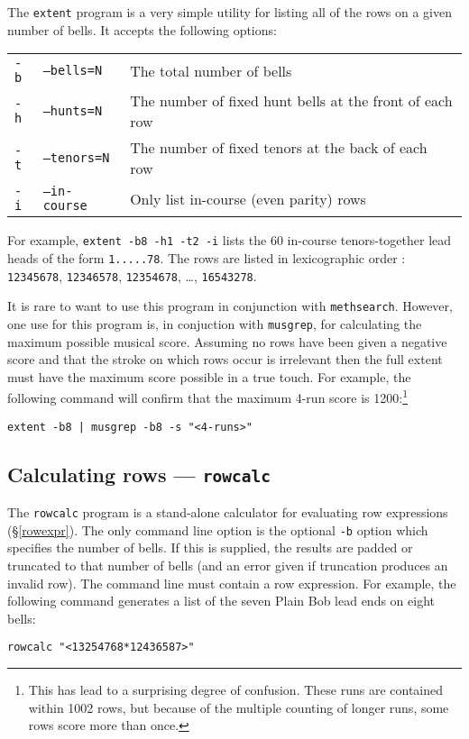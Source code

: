 \documentclass[a4paper,11pt,oneside]{book}
\makeatletter
\newcommand{\ttcmdidx}[1]{\texttt{#1}\index{#1@{\texttt{#1}}}}
\def\methsearch{\texttt{meth\-search}}
\newcommand{\sref}[1]{\hyperref[#1]{\S\ref{#1}}}
\makeatother
\begin{document}
The \ttcmdidx{extent} program is a very simple utility for listing all
of the rows on a given number of bells.  It accepts the following options:

\begin{tabularx}{\textwidth}{llX}
\texttt{-b}&\texttt{--bells=N}&The total number of bells\\
\texttt{-h}&\texttt{--hunts=N}&The number of fixed hunt bells at the front
  of each row\\
\texttt{-t}&\texttt{--tenors=N}&The number of fixed tenors at the back 
  of each row\\
\texttt{-i}&\texttt{--in-course}&Only list in-course (even parity) rows\\
\end{tabularx}

For example, \verb+extent -b8 -h1 -t2 -i+ lists the 60{} 
in-course tenors-together lead heads
of the form \verb+1.....78+.  The rows are listed in lexicographic order%
: \verb+12345678+, \verb+12346578+, 
\verb+12354678+, \ldots, \verb+16543278+.

It is rare to want to use this program in conjunction with \methsearch.
However, one use for this program is, in conjuction with \texttt{musgrep}, for
calculating the maximum possible musical score.  Assuming no rows 
have been given a negative score and that the stroke on which rows occur
is irrelevant then the full extent must have the maximum score possible
in a true touch.
For example, the following command will confirm that the maximum 4-run score
is 1200:\footnote{This has lead to a surprising degree of confusion.  These
runs are contained within 1002 rows, but because of the multiple counting of
longer runs, some rows score more than once.}
\begin{Verbatim}
extent -b8 | musgrep -b8 -s "<4-runs>" 
\end{Verbatim}


\subsection{Calculating rows — \texttt{rowcalc}}\label{rowcalc}

The \ttcmdidx{rowcalc} program is a stand-alone calculator for evaluating
row expressions (\sref{rowexpr}).  The only command line option is the 
optional \verb+-b+ option which specifies the number of bells. 
If this is supplied, the results are padded or truncated to that number of 
bells (and an error given if truncation produces an invalid row).
The command line must contain a row expression.  
For example, the following command generates a list
of the seven Plain Bob lead ends on eight bells:
\begin{Verbatim}
rowcalc "<13254768*12436587>"
\end{Verbatim}
\end{document}
